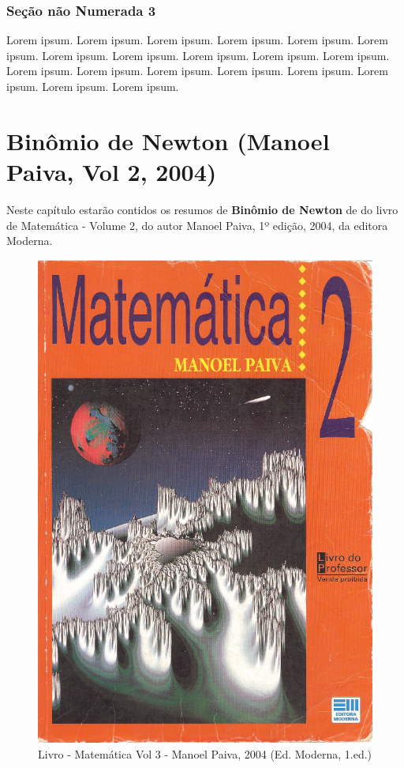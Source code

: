 \documentclass[
]{book}
\begin{document}
\hypertarget{seuxe7uxe3o-nuxe3o-numerada-3-1}{%
\subsection*{Seção não Numerada 3}\label{seuxe7uxe3o-nuxe3o-numerada-3-1}}

Lorem ipsum. Lorem ipsum. Lorem ipsum. Lorem ipsum. Lorem ipsum. Lorem ipsum. Lorem ipsum. Lorem ipsum. Lorem ipsum. Lorem ipsum. Lorem ipsum. Lorem ipsum. Lorem ipsum. Lorem ipsum. Lorem ipsum. Lorem ipsum. Lorem ipsum. Lorem ipsum. Lorem ipsum.

\hypertarget{binuxf4mio-de-newton-manoel-paiva-vol-2-2004}{%
\chapter{Binômio de Newton (Manoel Paiva, Vol 2, 2004)}\label{binuxf4mio-de-newton-manoel-paiva-vol-2-2004}}

Neste capítulo estarão contidos os resumos de \textbf{Binômio de Newton} de do livro de Matemática - Volume 2, do autor Manoel Paiva, 1º edição, 2004, da editora Moderna.

\begin{figure}

{\centering \includegraphics[width=0.5\linewidth]{imagens/Capa-Livro-Matematica-Volume-2-Manoel-Paiva-2004} 

}

\caption{Livro - Matemática Vol 3 - Manoel Paiva, 2004 (Ed. Moderna, 1.ed.)}\label{fig:unnamed-chunk-8}
\end{figure}
\end{document}
